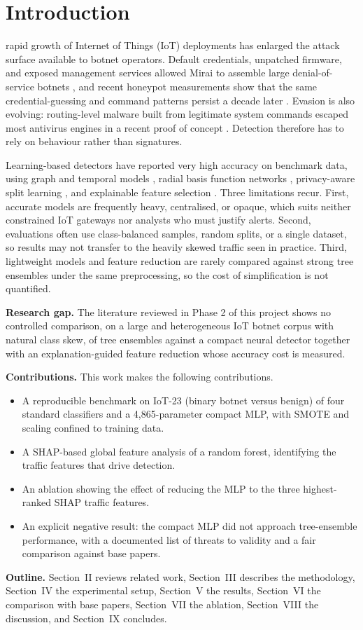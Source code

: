\section{Introduction}
 rapid growth of Internet of Things (IoT) deployments has enlarged the attack surface available to botnet operators. Default credentials, unpatched firmware, and exposed management services allowed Mirai to assemble large denial-of-service botnets \cite{antonakakis2017}, and recent honeypot measurements show that the same credential-guessing and command patterns persist a decade later \cite{banoth2026}. Evasion is also evolving: routing-level malware built from legitimate system commands escaped most antivirus engines in a recent proof of concept \cite{abujazoh2025}. Detection therefore has to rely on behaviour rather than signatures.

Learning-based detectors have reported very high accuracy on benchmark data, using graph and temporal models \cite{babenko2026,chai2026}, radial basis function networks \cite{awad2026}, privacy-aware split learning \cite{aljaafreh2026}, and explainable feature selection \cite{georgiades2025,hua2026}. Three limitations recur. First, accurate models are frequently heavy, centralised, or opaque, which suits neither constrained IoT gateways nor analysts who must justify alerts. Second, evaluations often use class-balanced samples, random splits, or a single dataset, so results may not transfer to the heavily skewed traffic seen in practice. Third, lightweight models and feature reduction are rarely compared against strong tree ensembles under the same preprocessing, so the cost of simplification is not quantified.

\textbf{Research gap.} The literature reviewed in Phase 2 of this project shows no controlled comparison, on a large and heterogeneous IoT botnet corpus with natural class skew, of tree ensembles against a compact neural detector together with an explanation-guided feature reduction whose accuracy cost is measured.

\textbf{Contributions.} This work makes the following contributions.
\begin{itemize}
\item A reproducible benchmark on IoT-23 (binary botnet versus benign) of four standard classifiers and a 4,865-parameter compact MLP, with SMOTE and scaling confined to training data.
\item A SHAP-based global feature analysis of a random forest, identifying the traffic features that drive detection.
\item An ablation showing the effect of reducing the MLP to the three highest-ranked SHAP traffic features.
\item An explicit negative result: the compact MLP did not approach tree-ensemble performance, with a documented list of threats to validity and a fair comparison against base papers.
\end{itemize}

\textbf{Outline.} Section~II reviews related work, Section~III describes the methodology, Section~IV the experimental setup, Section~V the results, Section~VI the comparison with base papers, Section~VII the ablation, Section~VIII the discussion, and Section~IX concludes.